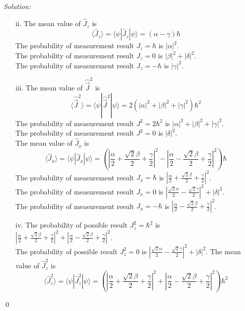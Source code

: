 \documentclass[10pt,a4paper]{article}
\newenvironment{sol}
    {\emph{Solution:}
    }
    {
    \qed
    }
\begin{document}
\begin{sol}
\begin{itemize}
\begin{itemize}
\item[ii.] The mean value of $\hat{J}_z$ is
\begin{equation}
\langle\hat{J}_z\rangle=\langle\psi|\hat{J}_z|\psi\rangle=(\alpha-\gamma)\hbar
\end{equation}
The probability of measurement result $J_z=\hbar$ is $|\alpha|^2$.\\
The probability of measurement result $J_z=0$ is $|\beta|^2+|\delta|^2$.\\
The probability of measurement result $J_z=-\hbar$ is $|\gamma|^2$.
\item[iii.] The mean value of $\hat{\vec{J}}^2$ is
\begin{equation}
\langle\hat{\vec{J}}^2\rangle=\langle\psi|\hat{\vec{J}}^2|\psi\rangle=2(|\alpha|^2+|\beta|^2+|\gamma|^2)\hbar^2
\end{equation}
The probability of measurement result $J^2=2\hbar^2$ is $|\alpha|^2+|\beta|^2+|\gamma|^2$.\\
The probability of measurement result $J^2=0$ is $|\delta|^2$.\\
The mean value of $\hat{J}_x$ is
\begin{equation}
\langle\hat{J}_x\rangle=\langle\psi|\hat{J}_x|\psi\rangle=(|\frac{\alpha}{2}+\frac{\sqrt{2}\beta}{2}+\frac{\gamma}{2}|^2-|\frac{\alpha}{2}-\frac{\sqrt{2}\beta}{2}+\frac{\gamma}{2}|^2)\hbar
\end{equation}
The probability of measurement result $J_x=\hbar$ is $|\frac{\alpha}{2}+\frac{\sqrt{2}\beta}{2}+\frac{\gamma}{2}|^2$.\\
The probability of measurement result $J_x=0$ is $|\frac{\sqrt{2}\alpha}{2}-\frac{\sqrt{2}\gamma}{2}|^2+|\delta|^2$.\\
The probability of measurement result $J_x=-\hbar$ is $|\frac{\alpha}{2}-\frac{\sqrt{2}\beta}{2}+\frac{\gamma}{2}|^2$.
\item[iv.] The probability of possible result $J_z^2=\hbar^2$ is $|\frac{\alpha}{2}+\frac{\sqrt{2}\beta}{2}+\frac{\gamma}{2}|^2+|\frac{\alpha}{2}-\frac{\sqrt{2}\beta}{2}+\frac{\gamma}{2}|^2$.\\
The probability of possible result $J_z^2=0$ is $|\frac{\sqrt{2}\alpha}{2}-\frac{\sqrt{2}\gamma}{2}|^2+|\delta|^2$.
The mean value of $\hat{J}_z^2$ is
\begin{equation}
\langle\hat{J}_z^2\rangle=\langle\psi|\hat{J}_z^2|\psi\rangle=(|\frac{\alpha}{2}+\frac{\sqrt{2}\beta}{2}+\frac{\gamma}{2}|^2+|\frac{\alpha}{2}-\frac{\sqrt{2}\beta}{2}+\frac{\gamma}{2}|^2)\hbar^2
\end{equation}
\end{itemize}
\end{itemize}
\end{sol}
\end{document}
